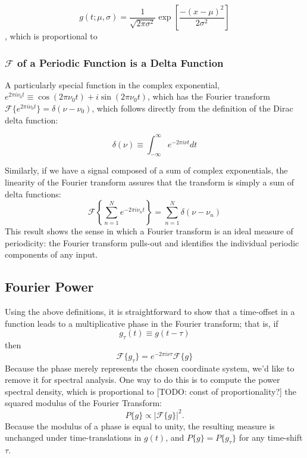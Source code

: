 \documentclass[preprint]{aastex}
\newcommand{\todo}[1]{{\color{red} [TODO: #1]}}
\begin{document}
\begin{equation}
    g(t; \mu, \sigma) = \frac{1}{\sqrt{2\pi\sigma^2}} \exp\left[\frac{- (x - \mu)^2}{2\sigma^2}\right]
\end{equation}, which is proportional to


\subsubsection{$\mathcal{F}$ of a Periodic Function is a Delta Function}

A particularly special function in the complex exponential, $e^{2\pi i\nu_0 t} \equiv \cos(2\pi \nu_0 t) + i\sin(2\pi\nu_0 t)$, which has the Fourier transform $\mathcal{F}\{e^{2\pi i\nu_0 t}\} = \delta(\nu - \nu_0)$, which follows directly from the definition of the Dirac delta function:

\begin{equation}
  \delta(\nu) \equiv \int_{-\infty}^\infty e^{-2\pi i\nu t}dt
\end{equation}

Similarly, if we have a signal composed of a sum of complex exponentials, the linearity of the Fourier transform assures that the transform is simply a sum of delta functions:
\begin{equation}
  \mathcal{F}\left\{ \sum_{n=1}^N e^{-2\pi i \nu_n t} \right\} = \sum_{n=1}^N \delta(\nu - \nu_n)
\end{equation}
This result shows the sense in which a Fourier transform is an ideal measure of periodicity: the Fourier transform pulls-out and identifies the individual periodic components of any input.

\subsection{Fourier Power}

Using the above definitions, it is straightforward to show that a time-offset in a function leads to a multiplicative phase in the Fourier transform; that is, if
\begin{equation}
  g_\tau(t) \equiv g(t - \tau)
\end{equation}
then
\begin{equation}
  \mathcal{F}\{g_\tau\} = e^{-2\pi i \nu \tau}\mathcal{F}\{g\}
\end{equation}
Because the phase merely represents the chosen coordinate system, we'd like to remove it for spectral analysis.
One way to do this is to compute the power spectral density, which is proportional to \todo{const of proportionality?} the squared modulus of the Fourier Transform:
\begin{equation}
  P\{g\} \propto \left| \mathcal{F}\{g\} \right|^2.
\end{equation}
Because the modulus of a phase is equal to unity, the resulting measure is unchanged under time-translations in $g(t)$, and $P\{g\} = P\{g_\tau\}$ for any time-shift $\tau$.
\end{document}
